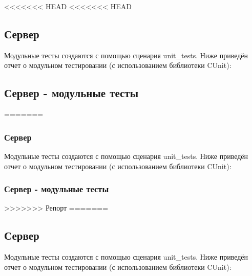 \documentclass[a4paper,12pt]{report}
\begin{document}
<<<<<<< HEAD
<<<<<<< HEAD
\subsection{Сервер}
Модульные тесты создаются с помощью сценария unit\_tests. Ниже приведён отчет о модульном тестировании (с использованием библиотеки CUnit):
\subsection{Сервер - модульные тесты}
=======
\subsubsection{Сервер}
Модульные тесты создаются с помощью сценария unit\_tests. Ниже приведён отчет о модульном тестировании (с использованием библиотеки CUnit):
\subsubsection{Сервер - модульные тесты}
>>>>>>> Репорт
=======
\subsection*{Сервер}
Модульные тесты создаются с помощью сценария unit\_tests. Ниже приведён отчет о модульном тестировании (с использованием библиотеки CUnit):
\end{document}
